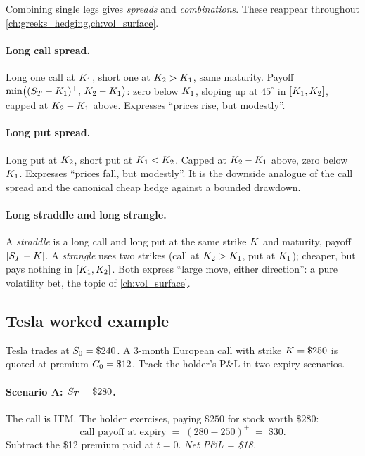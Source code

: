 Combining single legs gives \emph{spreads} and \emph{combinations}.
These reappear throughout \cref{ch:greeks_hedging,ch:vol_surface}.

\paragraph{Long call spread.} Long one call at $K_1$,
short one at $K_2 > K_1$, same maturity. Payoff
$\min\bigl((S_T - K_1)^+,\, K_2 - K_1\bigr)$:
zero below $K_1$, sloping up at $45^\circ$ in
$[K_1, K_2]$, capped at $K_2 - K_1$
above. Expresses ``prices rise, but modestly''.

\paragraph{Long put spread.} Long put at $K_2$, short put
at $K_1 < K_2$. Capped at $K_2 - K_1$
above, zero below $K_1$. Expresses ``prices fall, but
modestly''. It is the downside analogue of the call spread and
the canonical cheap hedge against a bounded drawdown.

\paragraph{Long straddle and long strangle.} A \emph{straddle}
is a long call and long put at the same strike $K$ and
maturity, payoff $|S_T - K|$. A \emph{strangle} uses
two strikes (call at $K_2 > K_1$, put at
$K_1$); cheaper, but pays nothing in
$[K_1, K_2]$. Both express ``large move, either
direction'': a pure volatility bet, the topic of
\cref{ch:vol_surface}.

\subsection{Tesla worked example}
\label{sec:ch14_tesla}

Tesla trades at $S_0 = \$240$. A 3-month European call with
strike $K = \$250$ is quoted at premium $C_0 = \$12$.
Track the holder's P\&L in two expiry scenarios.

\paragraph{Scenario A: $S_T = \$280$.} The call is ITM. The
holder exercises, paying $\$250$ for stock worth $\$280$:
\begin{equation*}
  \text{call payoff at expiry} \;=\; (280 - 250)^+ \;=\; \$30.
\end{equation*}
Subtract the \$12 premium paid at $t = 0$. \emph{Net P\&L = \$18.}

